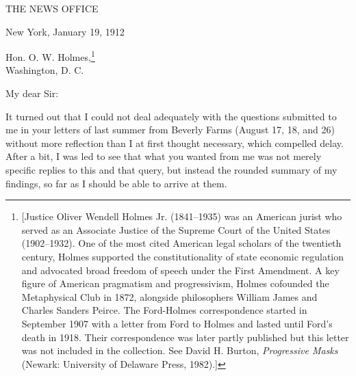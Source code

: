 \documentclass[twoside,symmetric,nobib,justified]{tufte-book}
\begin{document}
\vspace{.2in}

\begin{LARGE}


\end{LARGE}

\vspace{0.5in}


\begin{center}

{\Large THE NEWS OFFICE}

\end{center}

\vspace{0.1in}

\hfill New York, January 19, 1912

\vspace{0.2in}

\noindent Hon. O. W. Holmes,\footnote{{[}Justice Oliver Wendell Holmes Jr.
  (1841--1935) was an American jurist who served as an Associate Justice
  of the Supreme Court of the United States (1902--1932). One of the
  most cited American legal scholars of the twentieth century, Holmes
  supported the constitutionality of state economic
  regulation and advocated broad freedom of
  speech under the First Amendment. A key figure of American pragmatism
  and progressivism, Holmes cofounded the Metaphysical Club in 1872,
  alongside philosophers William James and Charles Sanders Peirce. The
  Ford-Holmes correspondence started in September 1907 with a letter from Ford
  to Holmes and lasted until Ford's death in 1918. Their correspondence
  was later partly published but this letter was not included in the
  collection. See David H. Burton, \emph{Progressive Masks} (Newark:
  University of Delaware Press, 1982).{]}}~~\\
Washington, D. C.~~

\vspace{0.1in}

\noindent My dear Sir:~

\vspace{0.05in}

It turned out that I could not deal adequately with the questions
submitted to me in your letters of last summer from Beverly Farms
(August 17, 18, and 26) without more reflection than I at first thought
necessary, which compelled delay. After a bit, I was led to see that
what you wanted from me was not merely specific replies to this and that
query, but instead the rounded summary of my findings, so far as I
should be able to arrive at them.~
\end{document}
